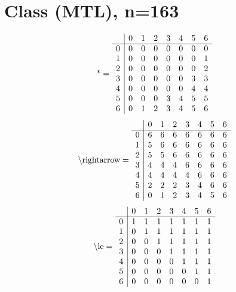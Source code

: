 \documentclass[11pt]{article}
\begin{document}
\section{Class (MTL), n=163}
\[\text{*} = 
\begin{array}{r | r r r r r r r}
 & 0 & 1 & 2 & 3 & 4 & 5 & 6 \\ \hline
0 & 0 & 0 & 0 & 0 & 0 & 0 & 0 \\
1 & 0 & 0 & 0 & 0 & 0 & 0 & 1 \\
2 & 0 & 0 & 0 & 0 & 0 & 0 & 2 \\
3 & 0 & 0 & 0 & 0 & 0 & 3 & 3 \\
4 & 0 & 0 & 0 & 0 & 0 & 4 & 4 \\
5 & 0 & 0 & 0 & 3 & 4 & 5 & 5 \\
6 & 0 & 1 & 2 & 3 & 4 & 5 & 6 \\
\end{array}
\]
\[\text{\textbackslash rightarrow} = 
\begin{array}{r | r r r r r r r}
 & 0 & 1 & 2 & 3 & 4 & 5 & 6 \\ \hline
0 & 6 & 6 & 6 & 6 & 6 & 6 & 6 \\
1 & 5 & 6 & 6 & 6 & 6 & 6 & 6 \\
2 & 5 & 5 & 6 & 6 & 6 & 6 & 6 \\
3 & 4 & 4 & 4 & 6 & 6 & 6 & 6 \\
4 & 4 & 4 & 4 & 4 & 6 & 6 & 6 \\
5 & 2 & 2 & 2 & 3 & 4 & 6 & 6 \\
6 & 0 & 1 & 2 & 3 & 4 & 5 & 6 \\
\end{array}
\]
\[\text{\textbackslash le} = 
\begin{array}{r | r r r r r r r}
 & 0 & 1 & 2 & 3 & 4 & 5 & 6 \\ \hline
0 & 1 & 1 & 1 & 1 & 1 & 1 & 1 \\
1 & 0 & 1 & 1 & 1 & 1 & 1 & 1 \\
2 & 0 & 0 & 1 & 1 & 1 & 1 & 1 \\
3 & 0 & 0 & 0 & 1 & 1 & 1 & 1 \\
4 & 0 & 0 & 0 & 0 & 1 & 1 & 1 \\
5 & 0 & 0 & 0 & 0 & 0 & 1 & 1 \\
6 & 0 & 0 & 0 & 0 & 0 & 0 & 1 \\
\end{array}
\]
\end{document}
